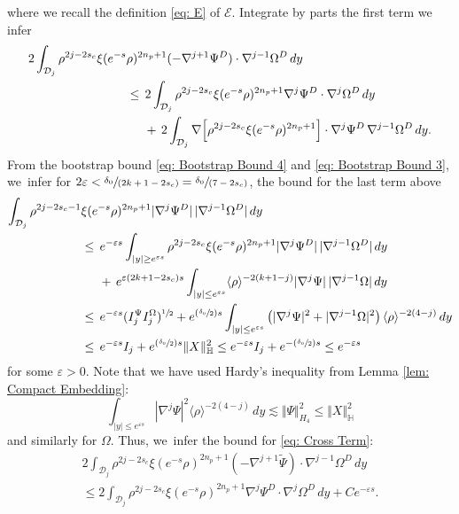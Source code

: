 \documentclass[JEP,XML,SOM,Unicode]{cedram}
\newcommand{\Psfrac}[2]{(\sfrac{#1}{#2})}
\newcommand{\spfrac}[2]{\sfrac{#1}{(#2)}}
\theoremstyle{plain}
\theoremstyle{definition}
\begin{document}
where we recall the definition \eqref{eq: E} of $\mathcal E$. Integrate by parts the first term we infer
\begin{equation}
\label{eq: Cross Term}
\begin{aligned}
2\int_{\mathcal D_j} \rho^{2j-2s_c}\xi(e^{-s}&\rho)^{2n_p+1}(-\nabla^{j+1} \Psi^D)\cdot\nabla^{j-1}\Omega^D\,dy\\
&\le \,2\int_{\mathcal D_j} \rho^{2j-2s_c}\xi(e^{-s}\rho)^{2n_p+1}\nabla^j\Psi^D\cdot\nabla^j\Omega^D\,dy\\
&\hspace*{.5cm}+\,2\int_{\mathcal D_j} \nabla\Big[\rho^{2j-2s_c}\xi(e^{-s}\rho)^{2n_p+1}\Big]\cdot\nabla^j\Psi^D\,\nabla^{j-1}\Omega^D\,dy.
\end{aligned}
\end{equation}
From the bootstrap bound \eqref{eq: Bootstrap Bound 4} and \eqref{eq: Bootstrap Bound 3}, we~infer for $2\varepsilon<\spfrac{\delta_0}{2k+1-2s_c}=\spfrac{\delta_0}{7-2s_c}$, the bound for the last term above
\[
\begin{aligned}
\int_{\mathcal D_j} \rho^{2j-2s_c-1}&\xi(e^{-s}\rho)^{2n_p+1}|\nabla^j \Psi^D| \,|\nabla^{j-1}\Omega^D|\,dy\\
&\le \, e^{-\varepsilon s}\int_{|y|\ge e^{\varepsilon s}} \rho^{2j-2s_c}\xi(e^{-s}\rho)^{2n_p+1}|\nabla^j \Psi^D |\,|\nabla^{j-1}\Omega^D|\,dy\\
&\hspace*{.5cm}+\,e^{\varepsilon(2k+1-2s_c)s}\int_{|y|\le e^{\varepsilon s}} \langle\rho\rangle^{-2(k+1-j)}|\nabla^j\Psi |\,|\nabla^{j-1}\Omega|\,dy\\
&\le \,e^{-\varepsilon s}(I_j^\Psi I_j^\Omega)^{\sfrac{1}{2}}+e^{\Psfrac{\delta_0}{2} s}\int_{|y|\le e^{\varepsilon s}}\left(|\nabla^j \Psi |^2+|\nabla^{j-1}\Omega |^2\right)\langle\rho\rangle^{-2(4-j)}\,dy\\
&\le \,e^{-\varepsilon s}I_j+e^{\Psfrac{\delta_0}{2}s}\Vert X\Vert_{\mathbb H}^2\le e^{-\varepsilon s}I_j+e^{-\Psfrac{\delta_0}{2}s}\le e^{-\varepsilon s}
\end{aligned}
\]
for some $\varepsilon>0$. Note that we have used Hardy's inequality from Lemma \ref{lem: Compact Embedding}:
\begin{equation}
\label{eq: Hardy on Psi}
\int_{|y|\le e^{\varepsilon s}}|\nabla^j \Psi |^2\langle\rho\rangle^{-2(4-j)}\,dy\lesssim\Vert \Psi\Vert_{H_4}^2 \le\Vert X\Vert_{\mathbb H}^2
\end{equation}
and similarly for $\Omega$. Thus, we~infer the bound for \eqref{eq: Cross Term}:
\begin{multline*}
2\int_{\mathcal D_j} \rho^{2j-2s_c}\xi(e^{-s}\rho)^{2n_p+1}(-\nabla^{j+1} \tilde \Psi) \cdot\nabla^{j-1}\Omega^D\,dy\\
\le 2\int_{\mathcal D_j} \rho^{2j-2s_c}\xi(e^{-s}\rho)^{2n_p+1}\nabla^j\Psi^D\cdot\nabla^j\Omega^D\,dy+C e^{-\varepsilon s}.
\end{multline*}
\end{document}
